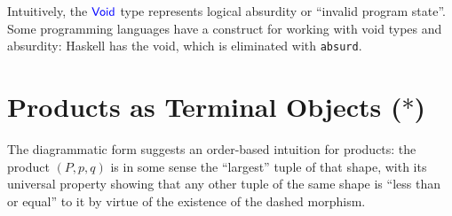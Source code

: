 \begin{mathpar}
\end{mathpar}

Intuitively, the $\mathsf{{\color{blue}Void}}$ type represents logical absurdity or 
``invalid program state''.
Some programming languages have a construct for working with 
void types and absurdity: Haskell has the void, which is 
eliminated with \texttt{absurd}.



\section{Products as Terminal Objects ($*$)}
\label{sec:products-as-terminal-objects}

The diagrammatic form suggests
an order-based intuition for products:
the product \((P,p,q)\) is
in some sense the ``largest''
tuple of that shape,
with its universal property
showing that any other tuple of the same shape is
``less than or equal'' to it by virtue of the existence of
the dashed morphism.

